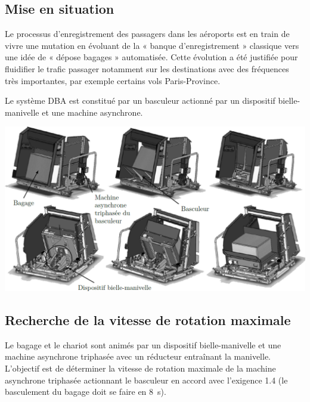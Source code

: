 \documentclass[10pt,fleqn]{article} %
\begin{document}

\vspace{4.5cm}
\pagestyle{fancy}
\thispagestyle{plain}


\def\columnseprulecolor{\color{ocre}}
\setlength{\columnseprule}{0.4pt} 

\ifprof
\begin{multicols}{2}
\else
\begin{multicols}{2}
\fi
\section*{Mise en situation}
\ifprof
\else
\fi

\ifprof
\else
Le processus d’enregistrement des passagers dans les aéroports est en train de
vivre une mutation en évoluant de la « banque d’enregistrement » classique vers une idée de « dépose bagages »
automatisée. Cette évolution a été justifiée pour fluidifier le trafic passager notamment sur les destinations avec
des fréquences très importantes, par exemple certains vols Paris-Province.


Le système DBA est constitué par un basculeur actionné par un dispositif bielle-manivelle et une machine
asynchrone.


\begin{center}
\includegraphics[width=\linewidth]{images/fig_01}
\end{center}

\fi

\subsection*{Recherche de la vitesse de rotation maximale}
\begin{obj} 
Le bagage et le chariot sont animés par un dispositif bielle-manivelle et une machine asynchrone
triphasée avec un réducteur entraînant la manivelle. L’objectif est de déterminer la vitesse de rotation
maximale de la machine asynchrone triphasée actionnant le basculeur en accord avec l’exigence 1.4
(le basculement du bagage doit se faire en \SI{8}{s}).
\end{obj}


\end{multicols}
\end{multicols}
\end{document}

